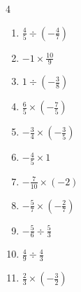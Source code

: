 \begin{multicols}{4}
\begin{enumerate}

  \item $\displaystyle \frac{4}{5}\div{}\left(-\frac{4}{7}\right)$


  \item $\displaystyle -1\times{}\frac{10}{9}$


  \item $\displaystyle 1\div{}\left(-\frac{3}{8}\right)$


  \item $\displaystyle \frac{6}{5}\times{}\left(-\frac{7}{5}\right)$


  \item $\displaystyle -\frac{3}{4}\times{}\left(-\frac{3}{5}\right)$


\columnbreak %

\resetques

  \item $\displaystyle -\frac{4}{5}\times{}1$


  \item $\displaystyle -\frac{7}{10}\times{}\left(-2\right)$


  \item $\displaystyle -\frac{5}{7}\times{}\left(-\frac{2}{7}\right)$


  \item $\displaystyle -\frac{5}{6}\div{}\frac{5}{3}$


  \item $\displaystyle \frac{4}{9}\div{}\frac{4}{3}$


  \item $\displaystyle \frac{2}{3}\times{}\left(-\frac{3}{2}\right)$


\end{enumerate}
\end{multicols}
